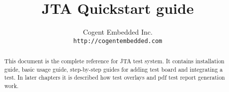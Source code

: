 \documentclass{article}
\title{JTA Quickstart guide}
\author{Cogent Embedded Inc.\\ \texttt{http://cogentembedded.com}}
\begin{document}
\maketitle
\newpage

\begin{abstract}
  This document is the complete reference for JTA test system. It contains installation guide, basic usage guide, step-by-step guides for adding test board and integrating a test. In later chapters it is described how test overlays and pdf test report generation work.
\end{abstract}

\newpage
\tableofcontents
\newpage

\newpage

\newpage

\newpage

\newpage

\newpage

\newpage

\newpage

\newpage

\end{document}
